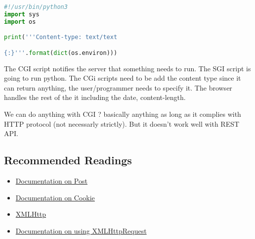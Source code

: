 \begin{lstlisting}[language=python,caption=CGI script]
#!/usr/bin/python3
import sys
import os 

print('''Content-type: text/text

{:}'''.format(dict(os.environ)))
\end{lstlisting}

\vspace{1em}

%    
\vspace{1em}

The CGI script notifies the server that something needs to run. The SGI script is going to run python.
The CGi scripts need to be add the content type since it can return anything, the user/programmer needs to specify it. The browser handles the rest of the it including the date, content-length.

We can do anything with CGI ? basically anything as long as it complies with HTTP protocol (not necessarly strictly). But it doesn't work well with REST API.

\subsection{Recommended Readings}
\begin{itemize}[noitemsep]
	\item \href{https://developer.mozilla.org/en-US/docs/Web/HTTP/Methods/POST}{Documentation on Post}
	\item \href{https://developer.mozilla.org/en-US/docs/Web/HTTP/Cookies}{Documentation on Cookie}
	\item  \href{https://developer.mozilla.org/en-US/docs/Web/API/XMLHttpRequest}{XMLHttp}
	\item  \href{https://developer.mozilla.org/en-US/docs/Web/API/XMLHttpRequest_API/Using_XMLHttpRequest}{Documentation on using XMLHttpRequest}
\end{itemize}

